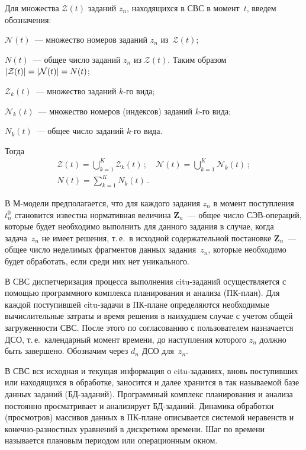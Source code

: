 \begin{multicols}{2}
Для множества $\mathcal{Z}(t)$ заданий $z_n$, находящихся в СВС в момент~$t$,
введем обозначения:

$\mathcal{N}(t)$~--- множество номеров  заданий $z_n$ из~$\mathcal{Z}(t)$;

$N(t)$~--- общее число заданий $z_n$ из  $\mathcal{Z}(t)$. Таким образом  
$|\mathcal{Z}(t)| \hm= |\mathcal{N}(t)| \hm= N(t)$;

$\mathcal{Z}_k(t)$~--- множество заданий $k$-го вида;

$\mathcal{N}_k(t)$~--- множество номеров  (индексов) заданий $k$-го вида;

$N_k(t)$~--- общее число заданий $k$-го вида.

Тогда
\begin{gather*}
\mathcal{Z}(t) = \bigcup\limits_{k = 1}^{K} \mathcal{Z}_k(t)\,; \quad 
\mathcal{N}(t) = \bigcup_{k = 1}^{K} \mathcal{N}_k(t)\,; \\
N(t) =\sum\limits_{k = 1}^{K} N_k(t)\,.
\end{gather*}

В М-модели предполагается, что для каж\-до\-го задания $z_n$ в момент
поступления $t_n^0$ становится известна нормативная величина
$\textbf{Z}_{n}$~---  общее  число СЭВ-опе\-ра\-ций, которые будет
необходимо выполнить для данного задания в случае, когда  задача~$z_{n}$  
не имеет решения, т.\,е.\ в исходной содержательной
постановке $\textbf{Z}_{n}$~--- общее число   неделимых фрагментов
данных задания~$z_{n}$, которые необходимо будет обработать, если
среди них нет уникального.

В СВС диспетчеризация процесса выполнения citu-за\-да\-ний
осуществляется с  помощью про\-грам\-мно\-го комплекса планирования и
анализа (ПК-план). Для каж\-дой поступившей  citu-за\-да\-чи в  ПК-пла\-не
определяются необходимые вычислительные  затраты и время решения  в
наихудшем случае с учетом общей загруженности СВС. После этого по
согласованию с пользователем назначается ДСО, т.\,е.\ календарный
момент времени, до наступления которого  $z_n$ должно быть
завершено. Обозначим  через $d_n$ ДСО для~$z_n$.

В СВС вся исходная и текущая информация о citu-за\-да\-ни\-ях, вновь
поступивших или находящихся в обработке, заносится  и далее хранится
в так называемой базе данных заданий (БД-за\-да\-ний). Про\-граммный комплекс планирования и
анализа
постоянно просматривает и анализирует БД-за\-да\-ний. Динамика обработки
(просмотров) массивов данных в ПК-пла\-не описывается сис\-те\-мой
неравенств и ко\-неч\-но-раз\-ност\-ных уравнений в дискретном времени. Шаг
по времени называется плановым периодом или операционным окном.


\end{multicols}
